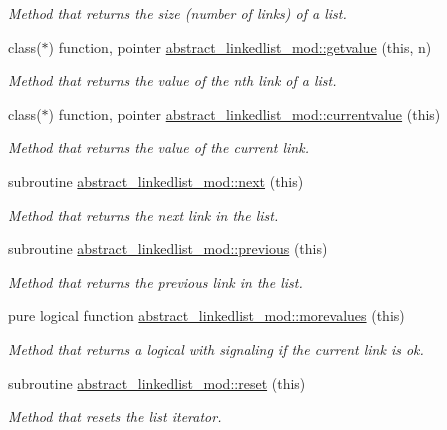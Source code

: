 \begin{DoxyCompactItemize}
\begin{DoxyCompactList}\small\item\em Method that returns the size (number of links) of a list. \end{DoxyCompactList}\item 
class($\ast$) function, pointer \mbox{\hyperlink{namespaceabstract__linkedlist__mod_a3c3ad627fd9f87da9831c53802975104}{abstract\+\_\+linkedlist\+\_\+mod\+::getvalue}} (this, n)
\begin{DoxyCompactList}\small\item\em Method that returns the value of the nth link of a list. \end{DoxyCompactList}\item 
class($\ast$) function, pointer \mbox{\hyperlink{namespaceabstract__linkedlist__mod_a87a81a4be29c8d4e8d2fb0d02247033b}{abstract\+\_\+linkedlist\+\_\+mod\+::currentvalue}} (this)
\begin{DoxyCompactList}\small\item\em Method that returns the value of the current link. \end{DoxyCompactList}\item 
subroutine \mbox{\hyperlink{namespaceabstract__linkedlist__mod_a576f148096561712d6ddd8c848bc7c4b}{abstract\+\_\+linkedlist\+\_\+mod\+::next}} (this)
\begin{DoxyCompactList}\small\item\em Method that returns the next link in the list. \end{DoxyCompactList}\item 
subroutine \mbox{\hyperlink{namespaceabstract__linkedlist__mod_a0b36d862899c5a40cb98bef4ffd5e2f4}{abstract\+\_\+linkedlist\+\_\+mod\+::previous}} (this)
\begin{DoxyCompactList}\small\item\em Method that returns the previous link in the list. \end{DoxyCompactList}\item 
pure logical function \mbox{\hyperlink{namespaceabstract__linkedlist__mod_a91ec7f6e570a87769ebb3d11b33f577e}{abstract\+\_\+linkedlist\+\_\+mod\+::morevalues}} (this)
\begin{DoxyCompactList}\small\item\em Method that returns a logical with signaling if the current link is ok. \end{DoxyCompactList}\item 
subroutine \mbox{\hyperlink{namespaceabstract__linkedlist__mod_a46ff8b8a3ab81610eb47d72d742778c3}{abstract\+\_\+linkedlist\+\_\+mod\+::reset}} (this)
\begin{DoxyCompactList}\small\item\em Method that resets the list iterator. \end{DoxyCompactList}\end{DoxyCompactItemize}
